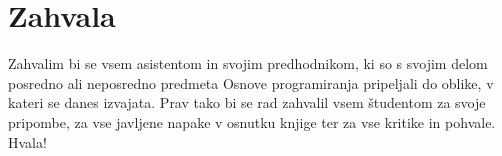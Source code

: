 \chapter*{Zahvala}

Zahvalim bi se vsem asistentom in svojim predhodnikom, ki so s svojim delom posredno ali neposredno predmeta Osnove programiranja pripeljali do oblike, v kateri se danes izvajata. Prav tako bi se rad zahvalil vsem študentom za svoje pripombe, za vse javljene napake v osnutku knjige ter za vse kritike in pohvale. Hvala!


